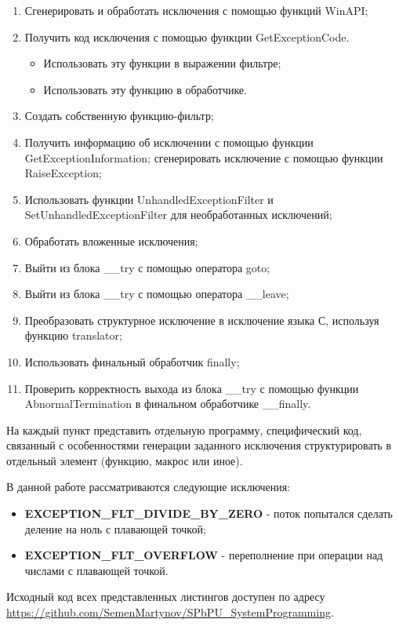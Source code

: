\documentclass[a4paper,12pt]{article} %
\begin{document}
\begin{enumerate}
	\item Сгенерировать и обработать исключения с помощью функций WinAPI;
	\item Получить код исключения с помощью функции GetExceptionCode.
		\begin{itemize}
		\item Использовать эту функции в выражении фильтре;
		\item Использовать эту функцию в обработчике.
		\end{itemize}
	\item Создать собственную функцию-фильтр;
	\item Получить информацию об исключении с помощью функции GetExceptionInformation; сгенерировать исключение с помощью функции RaiseException;
	\item Использовать функции UnhandledExceptionFilter и SetUnhandledExceptionFilter для необработанных исключений;
	\item Обработать вложенные исключения;
	\item Выйти из блока \_\_try с помощью оператора goto;
	\item Выйти из блока \_\_try с помощью оператора \_\_leave;
	\item Преобразовать структурное исключение в исключение языка С, используя функцию translator;
	\item Использовать финальный обработчик finally;
	\item Проверить корректность выхода из блока \_\_try с помощью функции AbnormalTermination в финальном обработчике \_\_finally.
\end{enumerate}


На каждый пункт представить отдельную программу, специфический код, связанный с особенностями генерации заданного исключения структурировать в отдельный элемент (функцию, макрос или иное).

\vspace{1em}
В данной работе рассматриваются следующие исключения:
\begin{itemize}
\item \textbf{EXCEPTION\_FLT\_DIVIDE\_BY\_ZERO} - поток попытался сделать деление на ноль с плавающей точкой;
\item \textbf{EXCEPTION\_FLT\_OVERFLOW} - переполнение при операции над числами с плавающей точкой.
\end{itemize}

\vspace{1em}
Исходный код всех представленных листингов доступен по адресу \\ \url{https://github.com/SemenMartynov/SPbPU_SystemProgramming}.
\end{document}
